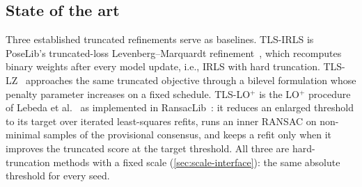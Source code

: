 \documentclass[runningheads]{llncs}
\newcommand{\tlsirls}{TLS-IRLS}   %
\begin{document}
\subsection{State of the art}
\label{sec:sota}
Three established truncated refinements serve as baselines. \tlsirls{} is
PoseLib's truncated-loss Levenberg--Marquardt refinement~\cite{PoseLib},
which recomputes binary weights after every model update, i.e., IRLS
with hard truncation. TLS-LZ~\cite{LeZach2021} approaches the same
truncated objective through a bilevel formulation whose penalty parameter
increases on a fixed schedule. TLS-LO$^+$ is the LO$^+$ procedure of
Lebeda et al.~\cite{Lebeda2012} as implemented in
RansacLib~\cite{Sattler2019Github}: it reduces an enlarged threshold to
its target over iterated least-squares refits, runs an inner RANSAC on
non-minimal samples of the provisional consensus, and keeps a refit only
when it improves the truncated score at the target threshold. All three
are hard-truncation methods with a fixed scale
(\cref{sec:scale-interface}): the same absolute threshold for every seed.
\end{document}
